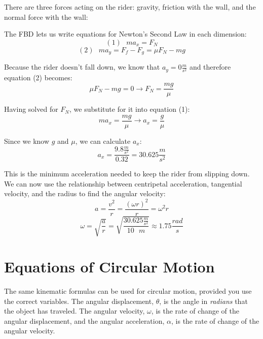 \begin{Answer}[ref = gravitron]
There are three forces acting on the rider: gravity, friction with the wall, and the normal force with the wall:

\begin{center}
\end{center}

The FBD lets us write equations for Newton's Second Law in each dimension:
$$\left( 1 \right) \text{ }ma_x = F_N$$
$$\left( 2 \right) \text{ }ma_y = F_f - F_g = \mu F_N - mg$$

Because the rider doesn't fall down, we know that $a_y = 0 \frac{m}{s^2}$ and therefore equation (2) becomes:
$$\mu F_N - mg = 0 \to F_N = \frac{mg}{\mu}$$

Having solved for $F_N$, we substitute for it into equation (1):
$$ma_x = \frac{mg}{\mu} \to a_x = \frac{g}{\mu}$$

Since we know $g$ and $\mu$, we can calculate $a_x$:
$$a_x = \frac{9.8 \frac{m}{s^2}}{0.32} = 30.625 \frac{m}{s^2}$$

This is the minimum acceleration needed to keep the rider from slipping down. We can now use the relationship between centripetal acceleration, tangential velocity, and the radius to find the angular velocity:
$$a = \frac{v^2}{r} = \frac{\left( \omega r \right)^2}{r} = \omega^2 r$$
$$\omega = \sqrt{\frac{a}{r}} = \sqrt{\frac{30.625 \frac{m}{s^2}}{10 \text{ } m}} \approx 1.75 \frac{rad}{s}$$
\end{Answer}

\section{Equations of Circular Motion}
The same kinematic formulas can be used for circular motion, provided you use the correct variables. The angular displacement, $\theta$, is the angle in \emph{radians} that the object has traveled. The angular velocity, $\omega$, is the rate of change of the angular displacement, and the angular acceleration, $\alpha$, is the rate of change of the angular velocity.

